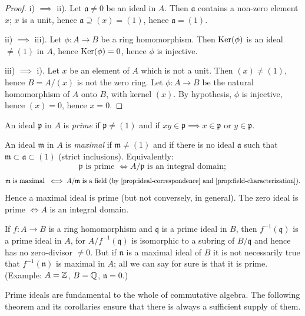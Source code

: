 \begin{proof}
\noindent i) $\implies$ ii). Let $\mathfrak{a} \neq 0$ be an ideal in $A$. Then $\mathfrak{a}$ contains a non-zero element $x$; $x$ is a unit, hence $\mathfrak{a} \supseteq (x) = (1)$, hence $\mathfrak{a} = (1)$.

ii) $\implies$ iii). Let $\phi \colon A \to B$ be a ring homomorphism. Then $\operatorname{Ker}(\phi)$ is an ideal $\neq (1)$ in $A$, hence $\operatorname{Ker}(\phi) = 0$, hence $\phi$ is injective.

iii) $\implies$ i). Let $x$ be an element of $A$ which is not a unit. Then $(x) \neq (1)$, hence $B = A/(x)$ is not the zero ring. Let $\phi \colon A \to B$ be the natural homomorphism of $A$ onto $B$, with kernel $(x)$. By hypothesis, $\phi$ is injective, hence $(x) = 0$, hence $x = 0$.
\end{proof}



An ideal $\mathfrak{p}$ in $A$ is \emph{prime} if $\mathfrak{p} \neq (1)$ and if $xy \in \mathfrak{p} \implies x \in \mathfrak{p}$ or $y \in \mathfrak{p}$.

An ideal $\mathfrak{m}$ in $A$ is \emph{maximal} if $\mathfrak{m} \neq (1)$ and if there is no ideal $\mathfrak{a}$ such that $\mathfrak{m} \subset \mathfrak{a} \subset (1)$ (strict inclusions). Equivalently:
\[
    \mathfrak{p} \text{ is prime } \iff A/\mathfrak{p} \text{ is an integral domain};
\]
\[
    \mathfrak{m} \text{ is maximal } \iff A/\mathfrak{m} \text{ is a field (by \eqref{prop:ideal-correspondence} and \eqref{prop:field-characterization})}.
\]
Hence a maximal ideal is prime (but not conversely, in general). The zero ideal is prime $\iff A$ is an integral domain.

If $f \colon A \to B$ is a ring homomorphism and $\mathfrak{q}$ is a prime ideal in $B$, then $f^{-1}(\mathfrak{q})$ is a prime ideal in $A$, for $A/f^{-1}(\mathfrak{q})$ is isomorphic to a subring of $B/\mathfrak{q}$ and hence has no zero-divisor $\neq 0$. But if $\mathfrak{n}$ is a maximal ideal of $B$ it is not necessarily true that $f^{-1}(\mathfrak{n})$ is maximal in $A$; all we can say for sure is that it is prime. (Example: $A = \mathbb{Z}$, $B = \mathbb{Q}$, $\mathfrak{n} = 0$.)

Prime ideals are fundamental to the whole of commutative algebra. The following theorem and its corollaries ensure that there is always a sufficient supply of them.

